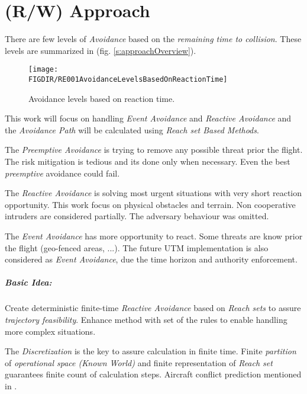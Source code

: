 \chapter{(R/W) Approach}\label{ch:approach}

\noindent There are few levels of \emph{Avoidance} based on the \emph{remaining time to collision}. These levels are summarized in (fig. \ref{s:approachOverview}).

\begin{figure}[H]
    \centering
    \texttt{[image: \\FIGDIR/RE001AvoidanceLevelsBasedOnReactionTime]} 
    \caption{Avoidance levels based on reaction time.}
    \label{fig:AvoidanceLevels}
\end{figure}

This work will focus on handling \emph{Event Avoidance} and \emph{Reactive Avoidance} and the \emph{Avoidance Path} will be calculated using \emph{Reach set Based Methods}. 

The \emph{Preemptive Avoidance} is trying to remove any possible threat prior the flight. The risk mitigation is tedious and its done only when necessary. Even the best \emph{preemptive} avoidance could fail.

The \emph{Reactive Avoidance} is solving most urgent situations with very short reaction opportunity. This work focus on physical obstacles and terrain. Non cooperative intruders are considered partially. The adversary behaviour was omitted.

The \emph{Event Avoidance} has more opportunity to react. Some threats are know prior the flight (geo-fenced areas, ...). The future UTM implementation is also considered as \emph{Event Avoidance}, due the time horizon and authority enforcement. 

\paragraph{Basic Idea:} Create deterministic finite-time \emph{Reactive Avoidance} based on \emph{Reach sets} to assure \emph{trajectory feasibility}. Enhance method with set of the rules to enable handling more complex situations.

The \emph{Discretization} is the key to assure calculation in finite time. Finite \emph{partition} of \emph{operational space (Known World)} and finite representation of \emph{Reach set} guarantees finite count of calculation steps. Aircraft conflict prediction mentioned in \cite{prandini2008application}.

